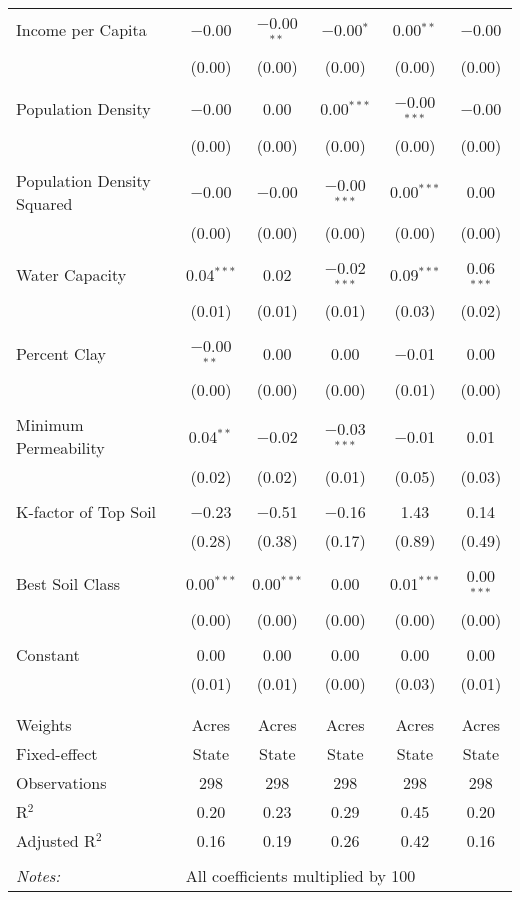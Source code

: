 \documentclass[10pt]{article}
\begin{document}
\begin{table}[!htbp]
\begin{tabular}{@{\extracolsep{5pt}}lccccc}
 Income per Capita & $-$0.00 & $-$0.00$^{**}$ & $-$0.00$^{*}$ & 0.00$^{**}$ & $-$0.00 \\ 
  & (0.00) & (0.00) & (0.00) & (0.00) & (0.00) \\ 
  & & & & & \\ 
 Population Density & $-$0.00 & 0.00 & 0.00$^{***}$ & $-$0.00$^{***}$ & $-$0.00 \\ 
  & (0.00) & (0.00) & (0.00) & (0.00) & (0.00) \\ 
  & & & & & \\ 
 Population Density Squared & $-$0.00 & $-$0.00 & $-$0.00$^{***}$ & 0.00$^{***}$ & 0.00 \\ 
  & (0.00) & (0.00) & (0.00) & (0.00) & (0.00) \\ 
  & & & & & \\ 
 Water Capacity & 0.04$^{***}$ & 0.02 & $-$0.02$^{***}$ & 0.09$^{***}$ & 0.06$^{***}$ \\ 
  & (0.01) & (0.01) & (0.01) & (0.03) & (0.02) \\ 
  & & & & & \\ 
 Percent Clay & $-$0.00$^{**}$ & 0.00 & 0.00 & $-$0.01 & 0.00 \\ 
  & (0.00) & (0.00) & (0.00) & (0.01) & (0.00) \\ 
  & & & & & \\ 
 Minimum Permeability & 0.04$^{**}$ & $-$0.02 & $-$0.03$^{***}$ & $-$0.01 & 0.01 \\ 
  & (0.02) & (0.02) & (0.01) & (0.05) & (0.03) \\ 
  & & & & & \\ 
 K-factor of Top Soil & $-$0.23 & $-$0.51 & $-$0.16 & 1.43 & 0.14 \\ 
  & (0.28) & (0.38) & (0.17) & (0.89) & (0.49) \\ 
  & & & & & \\ 
 Best Soil Class & 0.00$^{***}$ & 0.00$^{***}$ & 0.00 & 0.01$^{***}$ & 0.00$^{***}$ \\ 
  & (0.00) & (0.00) & (0.00) & (0.00) & (0.00) \\ 
  & & & & & \\ 
 Constant & 0.00 & 0.00 & 0.00 & 0.00 & 0.00 \\ 
  & (0.01) & (0.01) & (0.00) & (0.03) & (0.01) \\ 
  & & & & & \\ 
\hline \\[-1.8ex] 
Weights & Acres & Acres & Acres & Acres & Acres \\ 
Fixed-effect & State & State & State & State & State \\ 
Observations & 298 & 298 & 298 & 298 & 298 \\ 
R$^{2}$ & 0.20 & 0.23 & 0.29 & 0.45 & 0.20 \\ 
Adjusted R$^{2}$ & 0.16 & 0.19 & 0.26 & 0.42 & 0.16 \\ 
\hline 
\hline \\[-1.8ex] 
\textit{Notes:} & \multicolumn{5}{l}{All coefficients multiplied by 100} \\ 
\end{tabular} 
\end{table} 
\end{document}
